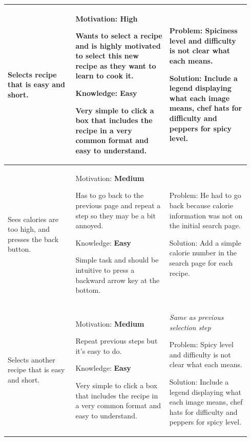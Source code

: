 \documentclass[11pt,english]{article}
\begin{document}
\begin{longtable}{!{\color{black}\vrule}>{\hspace{0pt}}m{0.262\linewidth}!{\color{black}\vrule}>{\hspace{0pt}}m{0.367\linewidth}!{\color{black}\vrule}>{\hspace{0pt}}m{0.312\linewidth}!{\color{black}\vrule}}
Selects recipe that is easy and short. & Motivation: \textbf{\textcolor[rgb]{0,0.502,0}{High}}\par{}Wants to select a recipe and is highly motivated to select this new recipe as they want to learn to cook it.\par{}Knowledge: \textbf{\textcolor[rgb]{0,0.502,0}{Easy}}\par{}Very simple to click a box that includes the recipe in a very common format and easy to understand. & Problem: Spiciness level and difficulty is not clear what each means.\par{}Solution: Include a legend displaying what each image means, chef hats for difficulty and peppers for spicy level. \\ \hline
Sees calories are too high, and presses the back button. & Motivation: \textbf{\textcolor[rgb]{1,0.647,0}{Medium}}\par{}Has to go back to the previous page and repeat a step so they may be a bit annoyed.~\par{}Knowledge: \textbf{\textcolor[rgb]{0,0.502,0}{Easy}}\par{}Simple task and should be intuitive to press a backward arrow key at the bottom. & Problem: He had to go back because calorie information was not on the initial search page.\par{}Solution: Add a simple calorie number in the search page for each recipe. \\ \hline
Selects another recipe that is easy and short.\par{} & Motivation: \textbf{\textcolor[rgb]{1,0.647,0}{Medium}}\par{}Repeat previous steps but it's easy to do.\par{}Knowledge: \textbf{\textcolor[rgb]{0,0.502,0}{Easy}}\par{}Very simple to click a box that includes the recipe in a very common format and easy to understand. & \textit{Same as previous selection step}\par{}Problem: Spicy level and difficulty is not clear what each means.\par{}Solution: Include a legend displaying what each image means, chef hats for difficulty and peppers for spicy level. \\ \hline

\end{longtable}
\end{document}
